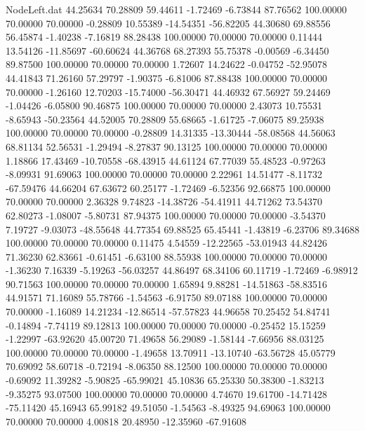 \begin{filecontents}{NodeLeft.dat}
  44.25634   70.28809   59.44611    -1.72469   -6.73844   87.76562  100.00000   70.00000   70.00000   -0.28809   10.55389  -14.54351  -56.82205
  44.30680   69.88556   56.45874    -1.40238   -7.16819   88.28438  100.00000   70.00000   70.00000    0.11444   13.54126  -11.85697  -60.60624
  44.36768   68.27393   55.75378    -0.00569   -6.34450   89.87500  100.00000   70.00000   70.00000    1.72607   14.24622   -0.04752  -52.95078
  44.41843   71.26160   57.29797    -1.90375   -6.81006   87.88438  100.00000   70.00000   70.00000   -1.26160   12.70203  -15.74000  -56.30471
  44.46932   67.56927   59.24469    -1.04426   -6.05800   90.46875  100.00000   70.00000   70.00000    2.43073   10.75531   -8.65943  -50.23564
  44.52005   70.28809   55.68665    -1.61725   -7.06075   89.25938  100.00000   70.00000   70.00000   -0.28809   14.31335  -13.30444  -58.08568
  44.56063   68.81134   52.56531    -1.29494   -8.27837   90.13125  100.00000   70.00000   70.00000    1.18866   17.43469  -10.70558  -68.43915
  44.61124   67.77039   55.48523    -0.97263   -8.09931   91.69063  100.00000   70.00000   70.00000    2.22961   14.51477   -8.11732  -67.59476
  44.66204   67.63672   60.25177    -1.72469   -6.52356   92.66875  100.00000   70.00000   70.00000    2.36328    9.74823  -14.38726  -54.41911
  44.71262   73.54370   62.80273    -1.08007   -5.80731   87.94375  100.00000   70.00000   70.00000   -3.54370    7.19727   -9.03073  -48.55648
  44.77354   69.88525   65.45441    -1.43819   -6.23706   89.34688  100.00000   70.00000   70.00000    0.11475    4.54559  -12.22565  -53.01943
  44.82426   71.36230   62.83661    -0.61451   -6.63100   88.55938  100.00000   70.00000   70.00000   -1.36230    7.16339   -5.19263  -56.03257
  44.86497   68.34106   60.11719    -1.72469   -6.98912   90.71563  100.00000   70.00000   70.00000    1.65894    9.88281  -14.51863  -58.83516
  44.91571   71.16089   55.78766    -1.54563   -6.91750   89.07188  100.00000   70.00000   70.00000   -1.16089   14.21234  -12.86514  -57.57823
  44.96658   70.25452   54.84741    -0.14894   -7.74119   89.12813  100.00000   70.00000   70.00000   -0.25452   15.15259   -1.22997  -63.92620
  45.00720   71.49658   56.29089    -1.58144   -7.66956   88.03125  100.00000   70.00000   70.00000   -1.49658   13.70911  -13.10740  -63.56728
  45.05779   70.69092   58.60718    -0.72194   -8.06350   88.12500  100.00000   70.00000   70.00000   -0.69092   11.39282   -5.90825  -65.99021
  45.10836   65.25330   50.38300    -1.83213   -9.35275   93.07500  100.00000   70.00000   70.00000    4.74670   19.61700  -14.71428  -75.11420
  45.16943   65.99182   49.51050    -1.54563   -8.49325   94.69063  100.00000   70.00000   70.00000    4.00818   20.48950  -12.35960  -67.91608

\end{filecontents}
